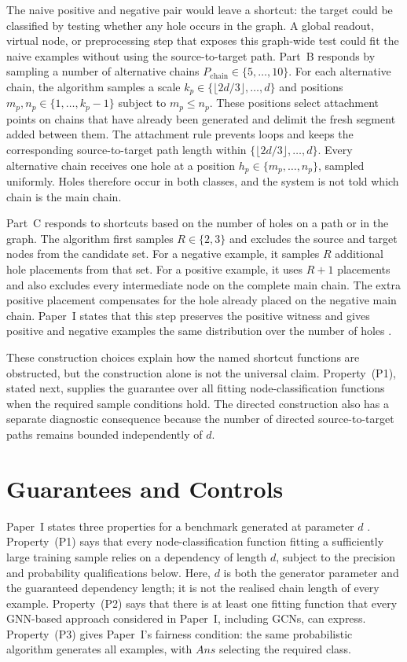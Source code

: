 The naive positive and negative pair would leave a shortcut: the target could be classified by testing whether any hole occurs in the graph.
A global readout, virtual node, or preprocessing step that exposes this graph-wide test could fit the naive examples without using the source-to-target path.
Part~B responds by sampling a number of alternative chains $P_{\mathrm{chain}}\in\{5,\ldots,10\}$.
For each alternative chain, the algorithm samples a scale $k_p\in\{\lfloor 2d/3\rfloor,\ldots,d\}$ and positions $m_p,n_p\in\{1,\ldots,k_p-1\}$ subject to $m_p\leq n_p$.
These positions select attachment points on chains that have already been generated and delimit the fresh segment added between them.
The attachment rule prevents loops and keeps the corresponding source-to-target path length within $\{\lfloor 2d/3\rfloor,\ldots,d\}$.
Every alternative chain receives one hole at a position $h_p\in\{m_p,\ldots,n_p\}$, sampled uniformly.
Holes therefore occur in both classes, and the system is not told which chain is the main chain.

Part~C responds to shortcuts based on the number of holes on a path or in the graph.
The algorithm first samples $R\in\{2,3\}$ and excludes the source and target nodes from the candidate set.
For a negative example, it samples $R$ additional hole placements from that set.
For a positive example, it uses $R+1$ placements and also excludes every intermediate node on the complete main chain.
The extra positive placement compensates for the hole already placed on the negative main chain.
Paper~I states that this step preserves the positive witness and gives positive and negative examples the same distribution over the number of holes \cite{zhou2025glora}.

These construction choices explain how the named shortcut functions are obstructed, but the construction alone is not the universal claim.
Property~(P1), stated next, supplies the guarantee over all fitting node-classification functions when the required sample conditions hold.
The directed construction also has a separate diagnostic consequence because the number of directed source-to-target paths remains bounded independently of $d$.

\section{Guarantees and Controls}
\label{sec:glora-expressibility}

Paper~I states three properties for a benchmark generated at parameter $d$ \cite{zhou2025glora}.
Property~(P1) says that every node-classification function fitting a sufficiently large training sample relies on a dependency of length $d$, subject to the precision and probability qualifications below.
Here, $d$ is both the generator parameter and the guaranteed dependency length; it is not the realised chain length of every example.
Property~(P2) says that there is at least one fitting function that every GNN-based approach considered in Paper~I, including GCNs, can express.
Property~(P3) gives Paper~I's fairness condition: the same probabilistic algorithm generates all examples, with $\mathit{Ans}$ selecting the required class.

